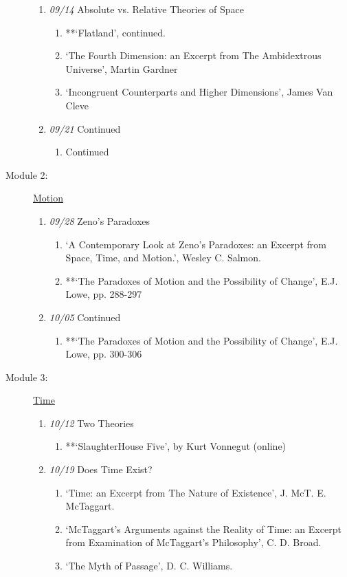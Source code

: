 \documentclass[article,oneside]{memoir}
\begin{document}
\begin{description}
\begin{enumerate}
\item \textit{09/14} Absolute vs. Relative Theories of Space
\begin{enumerate}
\item **`Flatland', continued.
\item `The Fourth Dimension: an Excerpt from The Ambidextrous Universe', Martin Gardner
\item `Incongruent Counterparts and Higher Dimensions', James Van Cleve
\end{enumerate}
\item \textit{09/21} Continued
\begin{enumerate}
\item Continued
\end{enumerate}
\end{enumerate}
\item[Module 2:] \href{http://scoconno.github.io/Teaching/Metaphysics/Motion}{Motion}
\begin{enumerate}
\item \textit{09/28} Zeno's Paradoxes
\begin{enumerate}
\item `A Contemporary Look at Zeno’s Paradoxes: an Excerpt from Space, Time, and Motion.', Wesley C. Salmon. 
\item **`The Paradoxes of Motion and the Possibility of Change', E.J. Lowe, pp. 288-297
\end{enumerate}
\item \textit{10/05} Continued
\begin{enumerate}
\item **`The Paradoxes of Motion and the Possibility of Change', E.J. Lowe, pp. 300-306
\end{enumerate}
\end{enumerate}
\item[Module 3:] \href{http://scoconno.github.io/Teaching/Metaphysics/Time}{Time}
\begin{enumerate}
\item \textit{10/12} Two Theories
\begin{enumerate}
\item **`SlaughterHouse Five', by Kurt Vonnegut (online)
\end{enumerate}
\item  \textit{10/19} Does Time Exist?
\begin{enumerate}
\item `Time: an Excerpt from The Nature of Existence', J. McT. E. McTaggart.
\item `McTaggart’s Arguments against the Reality of Time: an Excerpt from Examination of McTaggart’s Philosophy', C. D. Broad.
\item `The Myth of Passage', D. C. Williams.
\end{enumerate}


\end{enumerate}
\end{description}
\end{document}
